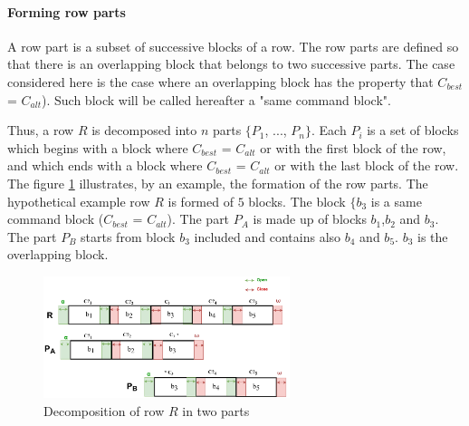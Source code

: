 \paragraph{\textbf{Forming row parts}} 
A row part is a subset of successive blocks of a row. The row parts are defined so that there is an overlapping block that belongs to two successive parts. The case considered here is the case where an overlapping block has the property that $C_{best}$ = $C_{alt}$). Such block will be called hereafter a "same command block".

Thus, a row $R$ is decomposed into $ n $ parts $ \{P_1$, ..., $P_n\}$. Each $P_i$ is a set of blocks which begins with a block where $C_{best}$ = $C_{alt}$ or with the first block of the row, and which ends with a block where $C_{best}$ = $C_{alt}$ or with the last block of the row.
The figure \ref{fig:decompo_in_two} illustrates, by an example, the formation of the row parts.
The hypothetical example row $R$ is formed of $5$ blocks. The block $\{b_{3}$ is a same command block ($C_{best}$ = $C_{alt}$). The part $P_{A}$ is made up of blocks $b_{1}$,$b_{2}$ and $b_{3}$. The part $ P_{B} $ starts from block $b_{3}$ included and contains also $b_{4}$ and $b_{5}$. $b_{3}$ is the overlapping block.


\begin{figure}[h!]
\begin{center}
\includegraphics[width=7.2cm]{decompo2.pdf} 
\caption{Decomposition of row $R$ in two parts} 
\label{fig:decompo_in_two}
\end{center}
\end{figure} 

